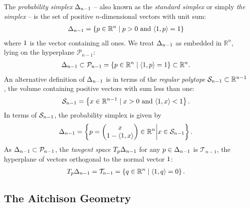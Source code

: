 The \textit{probability simplex} $\Delta_{n-1}$ -- also known as the \textit{standard simplex} or simply \textit{the simplex} -- is the set of positive $n$-dimensional vectors with unit sum:
\begin{align}\label{eqn:apx:prob_simplex}
    \Delta_{n-1} = \left\{ p \in \mathbb{R}^{n} \mid p > 0 \text{ and } \langle \mathrm{1}, p \rangle = 1 \right\}
\end{align}
where $\mathrm{1}$ is the vector containing all ones.
We treat $\Delta_{n-1}$ as embedded in $\mathbb{R}^{n}$, lying on the hyperplane $\mathcal{P}_{n-1}$:
\begin{align}
    \Delta_{n-1} \subset \mathcal{P}_{n-1} = \left\{ p \in \mathbb{R}^{n} \mid \langle \mathrm{1}, p \rangle = 1 \right\} \subset \mathbb{R}^{n}.
\end{align}
An alternative definition of $\Delta_{n-1}$ is in terms of the \textit{regular polytope} $\mathcal{S}_{n-1} \subset \mathbb{R}^{n-1}$, the volume containing positive vectors with sum less than one:
\begin{align}\label{eqn:apx:reg_polytope}
    \mathcal{S}_{n-1} = \left\{ x \in \mathbb{R}^{n-1} \mid x > 0 \text{ and } \langle \mathrm{1}, x \rangle < 1 \right\}.
\end{align}
In terms of $\mathcal{S}_{n-1}$, the probability simplex is given by
\begin{align}\label{eqn:apx:prob_simplex_factorized}
    \Delta_{n-1} = \left\{
    p = \begin{pmatrix}
        x \\
        1 - \langle \mathrm{1}, x \rangle
    \end{pmatrix}
    \in \mathbb{R}^{n}
    \bigg|
    x \in \mathcal{S}_{n-1}
    \right\}.
\end{align}
As $\Delta_{n-1} \subset \mathcal{P}_{n-1}$, the \textit{tangent space} $T_{p} \Delta_{n-1}$ for any $p \in \Delta_{n-1}$ is $\mathcal{T}_{n-1}$, the hyperplane of vectors orthogonal to the normal vector $\mathrm{1}$:
\begin{align}\label{eqn:apx:tangent_prob_simplex}
    T_{p} \Delta_{n-1} = \mathcal{T}_{n-1} = \left\{ q \in \mathbb{R}^{n} \mid \langle \mathrm{1}, q \rangle = 0 \right\}.
\end{align}

\subsection{The Aitchison Geometry}\label{sec:apx:aitchison_geometry}

